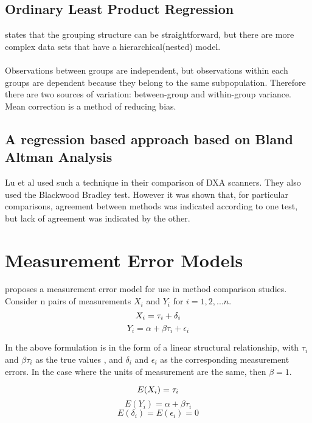 \documentclass[12pt, a4paper]{report}
\theoremstyle{plain}
\theoremstyle{definition}
\theoremstyle{remark}
\begin{document}
\subsection{Ordinary Least Product Regression}
\citet{ludbrook97} states that the grouping structure can be
straightforward, but there are more complex data sets that have a
hierarchical(nested) model.
\\
\\
Observations between groups are independent, but observations
within each groups are dependent because they belong to the same
subpopulation. Therefore there are two sources of variation:
between-group and within-group variance.
\vspace{5 mm} \noindent Mean correction is a method of reducing
bias.







\subsection{A regression based approach based on Bland Altman Analysis}
Lu et al used such a technique in their comparison of DXA
scanners. They also used the Blackwood Bradley test. However it
was shown that, for particular comparisons,  agreement between
methods was indicated according to one test, but lack of agreement
was indicated by the other.


\section{Measurement Error Models}
\citet{DunnSEME} proposes a measurement error model for use in
method comparison studies. Consider n pairs of measurements
$X_{i}$ and $Y_{i}$ for $i=1,2,...n$.
\begin{equation}
X_{i} = \tau_{i}+\delta_{i}\\
\end{equation}
\begin{equation}
Y_{i} = \alpha +\beta\tau_{i}+\epsilon_{i} \nonumber
\end{equation}

In the above formulation is in the form of a linear structural
relationship, with $\tau_{i}$ and $\beta\tau_{i}$ as the true
values , and $\delta_{i}$ and $\epsilon_{i}$ as the corresponding
measurement errors. In the case where the units of measurement are
the same, then $\beta =1$.

\begin{equation}
E(X_{i}) = \tau_{i}\\
\end{equation}
\begin{equation}
E(Y_{i}) = \alpha +\beta\tau_{i} \nonumber
\end{equation}
\begin{equation}
E(\delta_{i}) = E(\epsilon_{i}) = 0 \nonumber
\end{equation}
\end{document}
